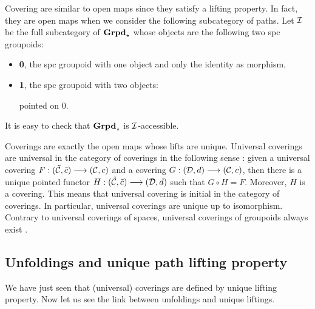 Covering are similar to open maps since they satisfy a lifting property. In fact, they are open maps when we consider the following subcategory of paths. Let $\mathcal{I}$ be the full subcategory of $\textbf{Grpd}_\star$ whose objects are the following two spc groupoids:
\begin{itemize}
	\item \textbf{0}, the spc groupoid with one object and only the identity as morphism,
	\item \textbf{1}, the spc groupoid with two objects: 
	\begin{center}
	\end{center}
	pointed on 0.
\end{itemize}
It is easy to check that $\textbf{Grpd}_\star$ is $\mathcal{I}$-accessible.

Coverings are exactly the open maps whose lifts are unique. Universal coverings are universal in the category of coverings in the following sense \cite{may99}: given a universal covering $F : (\tilde{\mathcal{C}},\tilde{c}) \longrightarrow (\mathcal{C},c)$ and a covering $G : (\mathcal{D},d) \longrightarrow (\mathcal{C},c)$, then there is a unique pointed functor $H : (\tilde{\mathcal{C}},\tilde{c}) \longrightarrow (\mathcal{D},d)$ such that $G\circ H = F$. Moreover, $H$ is a covering. This means that universal covering is initial in the category of coverings. In particular, universal coverings are unique up to isomorphism. Contrary to universal coverings of spaces, universal coverings of groupoids always exist \cite{may99}. 




\subsection{Unfoldings and unique path lifting property}
\label{uniquepathlifting}

We have just seen that (universal) coverings are defined by unique lifting property. Now let us see the link between unfoldings and unique liftings.

